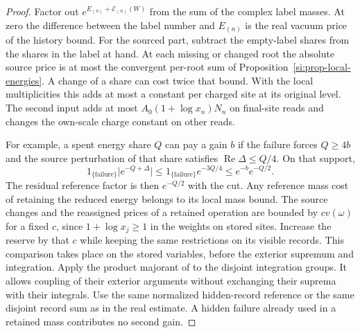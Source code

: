 \documentclass[11pt,letterpaper,reqno]{amsart}
\numberwithin{equation}{section}
\theoremstyle{definition}
\theoremstyle{remark}
\begin{document}
\begin{proof}
Factor out $e^{E_{(n)}+\mathcal E_{(n)}(W)}$ from the sum of the
complex label masses. At zero the difference between the label
number and $E_{(n)}$ is the real vacuum price of the history bound.
For the sourced part, subtract the empty-label shares from the
shares in the label at hand. At each missing or changed root the
absolute source price is at most the convergent per-root sum of
Proposition~\ref{si:prop-local-energies}. A change of a share can
cost twice that bound. With the local multiplicities this adds at
most a constant per charged site at its original level. The second
input adds at most $A_0(1+\log x_n)N_n$ on final-site reads and changes the
own-scale charge constant on other reads.

For example, a spent energy share $Q$ can pay a gain $b$ if the
failure forces $Q\ge4b$ and the source perturbation of that share
satisfies $\operatorname{Re}\Delta\le Q/4$. On that support,
\[
  1_{\{\mathrm{failure}\}}\bigl|e^{-Q+\Delta}\bigr|
       \le 1_{\{\mathrm{failure}\}}e^{-3Q/4}
       \le e^{-b}e^{-Q/2}.
\]
The residual reference factor is then $e^{-Q/2}$ with the cut.
Any reference mass cost of retaining the reduced energy belongs
to its local mass bound. The source changes and the reassigned
prices of a retained operation are bounded by $c v(\omega)$ for
a fixed $c$, since $1+\log x_j\ge1$ in the weights on stored sites.
Increase the reserve by that $c$ while keeping the same restrictions
on its visible records. This comparison takes place on the stored
variables, before the exterior supremum and integration. Apply
the product majorant of \cite[Lemma~8.1]{RT} to the disjoint integration groups.
It allows coupling of their exterior arguments without exchanging
their suprema with their integrals. Use the same normalized
hidden-record reference or the same disjoint record sum as in the
real estimate. A hidden failure already used in a retained mass
contributes no second gain.


\end{proof}
\end{document}
